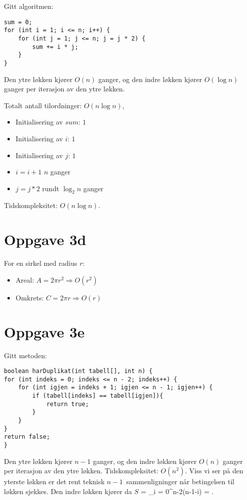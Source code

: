 \documentclass{article}
\begin{document}
Gitt algoritmen:

\begin{verbatim}
sum = 0;
for (int i = 1; i <= n; i++) {
    for (int j = 1; j <= n; j = j * 2) {
        sum += i * j;
    }
}
\end{verbatim}

Den ytre løkken kjører $O(n)$ ganger, og den indre løkken kjører $O(\log n)$ ganger per iterasjon av den ytre løkken.

Totalt antall tilordninger: $O(n \log n)$,
\begin{itemize}
\item Initialisering av $sum$: $1$ 
\item Initialisering av $i$: $1$ 
\item Initialisering av $j$: $1$ 
\item $i = i + 1$ $n$ ganger  
\item $j = j * 2$ rundt $\log_2 n$ ganger 
\end{itemize}

Tidskompleksitet: $O(n \log n)$.

\section*{Oppgave 3d}

For en sirkel med radius $r$:

\begin{itemize}
\item Areal: $A = 2\pi r^2 \Rightarrow O(r^2)$
\item Omkrets: $C = 2\pi r \Rightarrow O(r)$
\end{itemize}

\section*{Oppgave 3e}

Gitt metoden:

\begin{verbatim}
boolean harDuplikat(int tabell[], int n) {
for (int indeks = 0; indeks <= n - 2; indeks++) {
    for (int igjen = indeks + 1; igjen <= n - 1; igjen++) {
        if (tabell[indeks] == tabell[igjen]){
            return true;
        }
    }
}
return false;
}
\end{verbatim}

Den ytre løkken kjører $n-1$ ganger, og den indre løkken kjører $O(n)$ ganger per iterasjon av den ytre løkken. 
Tidskompleksitet: $O(n^2)$.
Viss vi ser på den yterste løkken er det rent teknisk $n-1$ sammenligninger når betingelsen til løkken sjekkes. 
Den indre løkken kjører da $S$ = \displaystyle\sum_{i = 0}^{n-2}(n-1-i) = . 
\end{document}
